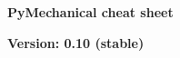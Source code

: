 \documentclass[9pt,landscape]{article}
\begin{document}
\raggedright
\footnotesize

\begin{center}
     \Huge{\textbf{PyMechanical cheat sheet}} \\
\end{center}

\begin{center}
  \small{\textbf{Version: 0.10 (stable)}} \\
\end{center}

\vspace{-0.40cm}
\noindent\makebox[\linewidth]{\rule{\paperwidth}{2pt}}
\end{document}
